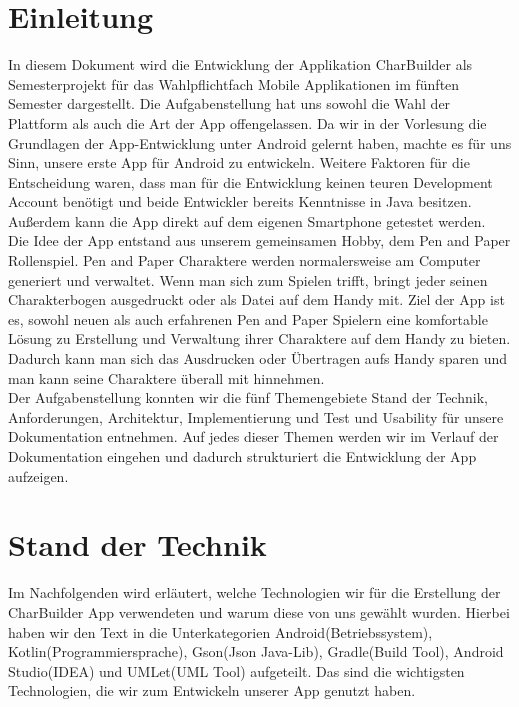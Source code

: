 \newpage
\section{Einleitung}
In diesem Dokument wird die Entwicklung der Applikation CharBuilder als Semesterprojekt für das Wahlpflichtfach Mobile Applikationen im fünften Semester dargestellt. Die Aufgabenstellung hat uns sowohl die Wahl der Plattform als auch die Art der App offengelassen. Da wir in der Vorlesung die Grundlagen der App-Entwicklung unter Android gelernt haben, machte es für uns Sinn, unsere erste App für Android zu entwickeln. Weitere Faktoren für die Entscheidung waren, dass man für die Entwicklung keinen teuren Development Account benötigt und beide Entwickler bereits Kenntnisse in Java besitzen. Außerdem kann die App direkt auf dem eigenen Smartphone getestet werden.\\

Die Idee der App entstand aus unserem gemeinsamen Hobby, dem Pen and Paper Rollenspiel. Pen and Paper Charaktere werden normalersweise am Computer generiert und verwaltet. Wenn man sich zum Spielen trifft, bringt jeder seinen Charakterbogen ausgedruckt oder als Datei auf dem Handy mit. Ziel der App ist es, sowohl neuen als auch erfahrenen Pen and Paper Spielern eine komfortable Lösung zu Erstellung und Verwaltung ihrer Charaktere auf dem Handy zu bieten. Dadurch kann man sich das Ausdrucken oder Übertragen aufs Handy sparen und man kann seine Charaktere überall mit hinnehmen.\\

Der Aufgabenstellung konnten wir die fünf Themengebiete Stand der Technik, Anforderungen, Architektur, Implementierung und Test und Usability für unsere Dokumentation entnehmen. Auf jedes dieser Themen werden wir im Verlauf der Dokumentation eingehen und dadurch strukturiert die Entwicklung der App aufzeigen.

\newpage
\section{Stand der Technik}
Im Nachfolgenden wird erläutert, welche Technologien wir für die Erstellung der CharBuilder App verwendeten und warum diese von uns gewählt wurden. Hierbei haben wir den Text in die Unterkategorien Android(Betriebssystem), Kotlin(Programmiersprache), Gson(Json Java-Lib), Gradle(Build Tool), Android Studio(IDEA) und UMLet(UML Tool) aufgeteilt. Das sind die wichtigsten Technologien, die wir zum Entwickeln unserer App genutzt haben.

